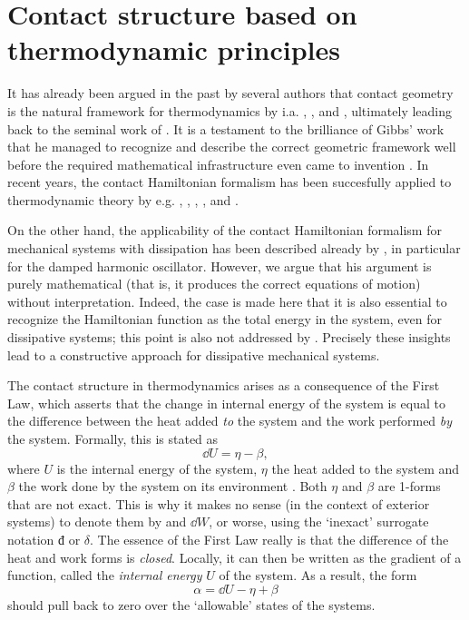 \section{Contact structure based on thermodynamic principles}
\label{sec:thermodynamics}
It has already been argued in the past by several authors that contact geometry is the natural framework for thermodynamics by i.a. \citet{Arnold1991,Arnold1989a,Arnold1989,Arnold1989b}, \citet{Bamberg1988}, \citet{Burke1985} and \citet{Hermann1973}, ultimately leading back to the seminal work of \citet{Gibbs1873}. It is a testament to the brilliance of Gibbs' work that he managed to recognize and describe the correct geometric framework well before the required mathematical infrastructure even came to invention \cite{Wightman1979}. 
In recent years, the contact Hamiltonian formalism has been succesfully applied to thermodynamic theory by e.g. \citet{Mrugala1991,Mrugala2000,Mrugala1984,Mrugala1985,Mrugala1993,Mrugala1996}, \citet{Balian2001}, \citet{VanderSchaft2021a}, \citet{Bravetti2015}, and \citet{Simoes2020}. 

On the other hand, the applicability of the contact Hamiltonian formalism for mechanical systems with dissipation has been described already by \citet{Bravetti2017}, in particular for the damped harmonic oscillator. However, we argue that his argument is purely mathematical (that is, it produces the correct equations of motion) without interpretation. Indeed, the case is made here that it is also essential to recognize the Hamiltonian function as the total energy in the system, even for dissipative systems; this point is also not addressed by \citeauthor{Bravetti2017}. Precisely these insights lead to a constructive approach for dissipative mechanical systems.

The contact structure in thermodynamics arises as a consequence of the First Law, which asserts that the change in internal energy of the system is equal to the difference between the heat added \emph{to} the system and the work performed \emph{by} the system. Formally, this is stated as
\begin{equation}
    \dd{U} = \eta - \beta,
    \label{eq:thermo_first_law}
\end{equation}
where $U$ is the internal energy of the system, $\eta$ the heat added to the system and $\beta$ the work done by the system on its environment \cite{Bamberg1988,Frankel2012}. Both $\eta$ and $\beta$ are 1-forms that are not exact.  This is why it makes no sense (in the context of exterior systems) to denote them by \dj and $\dd{W}$, or worse, using the `inexact' surrogate notation $\text{đ}$ or $\delta$. The essence of the First Law really is that the difference of the heat and work forms is \emph{closed}. Locally, it can then be written as the gradient of a function, called the \emph{internal energy} $U$ of the system. As a result, the form 
$$ \alpha = \dd{U} - \eta + \beta $$
should pull back to zero over the `allowable' states of the systems.

